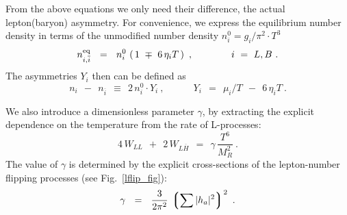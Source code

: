 \documentclass[12pt]{revtex4}
\newcommand{\eq}{{\rm eq}}
\newcommand{\lgr}{\left\lgroup}
\newcommand{\rgr}{\right\rgroup}
\newcommand{\Mpl}{M_{\rm Pl}}
\newcommand{\ov}{\overline}
\begin{document}
	From the above equations we only need their difference, the actual
	lepton(baryon) asymmetry.
	For convenience, we express the equilibrium number density in terms
	of the unmodified number density 
	$ n_i^0 = g_i/\pi^2 \cdot T^3 $
\[
	n_{i,\ov{i}}^\eq ~~=~~ n_i^0\, \left(\, 1 ~\mp~ 6\,\eta_i T \,\right)~,
	\qquad\qquad{i ~=~ L, B}~.
\]
	The asymmetries $ Y_i $ then can be defined as
\[
	n_i ~~-~~ n_{\ov{i}} ~~\equiv~~ 2\, n_i^0 \cdot Y_i~,
	\qquad\quad Y_i ~~=~~ \mu_i/T ~~-~~ 6\,\eta_i T~.
\]
	
	We also introduce a dimensionless parameter $ \gamma $, 
	by extracting the explicit dependence on the temperature from
	the rate of L-processes:
\begin{equation*}
	4\, W_{LL} ~~+~~ 2\, W_{L\ov{H}} ~~=~~ 
		 \gamma\, \frac{T^6}{M_R^2}~.
\end{equation*}
	The value of $ \gamma $ is determined by the explicit 
	cross-sections of the lepton-number flipping processes
	(see Fig.~\ref{lflip_fig}):
\begin{equation}
\label{gamma}
	\gamma  ~~=~~ \frac{3}{2\pi^2}\, \lgr \sum |h_a|^2 \rgr^2~.
\end{equation}
\end{document}
